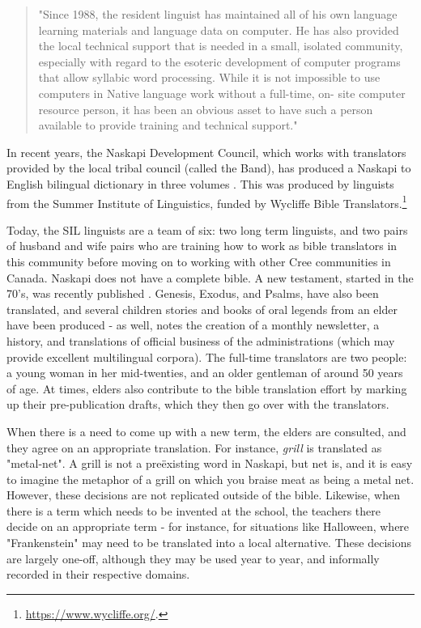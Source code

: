 \begin{quote}
"Since 1988, the resident linguist has maintained all of his own language learning materials and language data on computer. He has also provided the local technical support that is needed in a small, isolated community, especially with regard to the esoteric development of computer programs that allow syllabic word processing. While it is not impossible to use computers in Native language work without a full-time, on- site computer resource person, it has been an obvious asset to have such a person available to provide training and technical support." \citep[86]{jancewicz2002applied}
\end{quote}

In recent years, the Naskapi Development Council, which works with translators provided by the local tribal council (called the Band), has produced a Naskapi to English bilingual dictionary in three volumes \cite{MacKenzie-and-Jancewicz-1994}. This was produced by linguists from the Summer Institute of Linguistics, funded by Wycliffe Bible Translators.\footnote{\href{https://www.wycliffe.org/}{https://www.wycliffe.org/}. }

Today, the SIL linguists are a team of six: two long term linguists, and two pairs of husband and wife pairs who are training how to work as bible translators in this community before moving on to working with other Cree communities in Canada. Naskapi does not have a complete bible. A new testament, started in the 70's, was recently published \cite{naskapi-new-testament}. Genesis, Exodus, and Psalms, have also been translated, and several children stories and books of oral legends from an elder have been produced - as well, \citet{jancewicz2002applied} notes the creation of a monthly newsletter, a history, and translations of official business of the administrations (which may provide excellent multilingual corpora). The full-time translators are two people: a young woman in her mid-twenties, and an older gentleman of around 50 years of age. At times, elders also contribute to the bible translation effort by marking up their pre-publication drafts, which they then go over with the translators.

When there is a need to come up with a new term, the elders are consulted, and they agree on an appropriate translation. For instance, {\it grill} is translated as "metal-net". A grill is not a  pre\"{e}xisting word in Naskapi, but net is, and it is easy to imagine the metaphor of a grill on which you braise meat as being a metal net. However, these decisions are not replicated outside of the bible. Likewise, when there is a term which needs to be invented at the school, the teachers there decide on an appropriate term - for instance, for situations like Halloween, where "Frankenstein" may need to be translated into a local alternative. These decisions are largely one-off, although they may be used year to year, and informally recorded in their respective domains.

